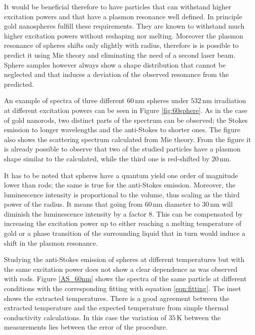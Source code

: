 \documentclass[journal=nalefd,manuscript=letter]{achemso}
\newcommand{\K}{\ensuremath{\,\textrm{K}}}
\newcommand{\nm}{\ensuremath{\,\textrm{nm}}}
\begin{document}

It would be beneficial therefore to have particles that can withstand higher
excitation powers and that have a plasmon resonance well defined. In principle
gold nanospheres fulfill these requirements. They are known to withstand much
higher excitation powers without reshaping nor melting. Moreover the plasmon
resonance of spheres shifts only slightly with radius, therefore is is possible
to predict it using Mie theory and eliminating the need of a second laser beam.
Sphere samples however always show a shape distribution that cannot be
neglected and that induces a deviation of the observed resonance from the
predicted.

An example of spectra of three different $60\nm$ spheres under $532\nm$
irradiation at different excitation powers can be seen in Figure
\ref{fig:60sphere}. As in the case of gold nanorods, two distinct parts of the
spectrum can be observed; the Stokes emission to longer wavelengths and the
anti-Stokes to shorter ones. The figure also shows the scattering spectrum
calculated from Mie theory. From the figure it is already possible to observe
that two of the studied particles have a plasmon shape similar to the
calculated, while the third one is red-shifted by $20\nm$. 

It has to be noted that spheres have a quantum yield one order of magnitude
lower than rods; the same is true for the anti-Stokes emission. Moreover, the
luminescence intensity is proportional to the volume, thus scaling as the third 
power of the radius. It means that going from $60\nm$ diameter to $30\nm$ will
diminish the luminescence intensity by a factor $8$. This can be compensated by
increasing the excitation power up to either reaching a melting temperature of 
gold or a phase transition of the surrounding liquid that in turn would induce
a shift in the plasmon resonance.

Studying the anti-Stokes emission of spheres at different temperatures but with
the same excitation power does not show a clear dependence as was observed with
rods. Figure \ref{AS_60nm} shows the spectra of the same particle at different
conditions with the corresponding fitting with equation \ref{eqn:fitting}. The
inset shows the extracted temperatures. There is a good agreement between the
extracted temperature and the expected temperature from simple thermal
conductivity calculations. In this case the variation of $35\K$ between the
measurements lies between the error of the procedure.
\end{document}
